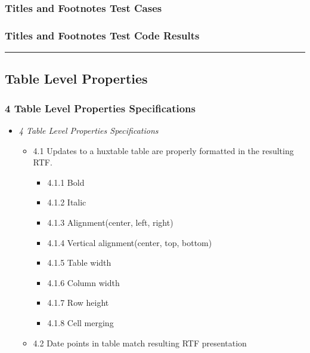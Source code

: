 \documentclass[]{article}
\providecommand{\tightlist}{%
  \setlength{\itemsep}{0pt}\setlength{\parskip}{0pt}}
\begin{document}
\hypertarget{titles-and-footnotes-test-cases}{%
\subsubsection{Titles and Footnotes Test
Cases}\label{titles-and-footnotes-test-cases}}

\hypertarget{titles-and-footnotes-test-code-results}{%
\subsubsection{Titles and Footnotes Test Code
Results}\label{titles-and-footnotes-test-code-results}}

\begin{center}\rule{0.5\linewidth}{0.5pt}\end{center}

\hypertarget{table-level-properties}{%
\subsection{Table Level Properties}\label{table-level-properties}}

\hypertarget{table-level-properties-specifications}{%
\subsubsection{4 Table Level Properties
Specifications}\label{table-level-properties-specifications}}

\begin{itemize}
\tightlist
\item
  \emph{4 Table Level Properties Specifications}

  \begin{itemize}
  \tightlist
  \item
    4.1 Updates to a huxtable table are properly formatted in the
    resulting RTF.

    \begin{itemize}
    \tightlist
    \item
      4.1.1 Bold
    \item
      4.1.2 Italic
    \item
      4.1.3 Alignment(center, left, right)
    \item
      4.1.4 Vertical alignment(center, top, bottom)
    \item
      4.1.5 Table width
    \item
      4.1.6 Column width
    \item
      4.1.7 Row height
    \item
      4.1.8 Cell merging
    \end{itemize}
  \item
    4.2 Date points in table match resulting RTF presentation
  \end{itemize}
\end{itemize}
\end{document}
